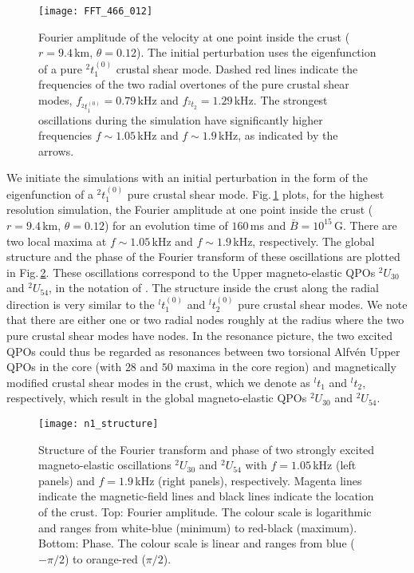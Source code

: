 \documentclass[useAMS,usenatbib]{mnras}
\begin{document}
%
\begin{figure}
\texttt{[image: FFT\_466\_012]}
\caption{Fourier amplitude of the velocity at one point inside the crust 
($r=9.4\,$km, $\theta=0.12$). The initial perturbation uses the eigenfunction 
of a pure $^2t^{(0)}_1$ crustal 
shear mode. Dashed red lines indicate the frequencies of the two radial 
overtones of the pure crustal shear modes, $f_{^2t^{(0)}_1}=0.79\,$kHz and 
$f_{^2t_2}=1.29\,$kHz. The strongest oscillations during the simulation have 
significantly higher frequencies $f\sim1.05\,$kHz and $f\sim1.9\,$kHz, as 
indicated by the arrows. }
\label{fig_n1_FFT}
\end{figure}

   We initiate the simulations with an initial perturbation in the form of the eigenfunction of a
$^2t^{(0)}_1$ pure crustal shear mode. Fig.\,\ref{fig_n1_FFT} plots, for the 
highest resolution simulation, the Fourier amplitude at one point inside the 
crust ($r=9.4\,$km, $\theta=0.12$) for an evolution time of $160\,$ms and $\bar 
B=10^{15}\,$G. There are two local maxima at $f\sim1.05\,$kHz and 
$f\sim1.9\,$kHz, respectively. The global structure and the phase of the Fourier 
transform of these oscillations are plotted in Fig.\,\ref{fig_n1_structure}. 
These oscillations correspond to the Upper magneto-elastic QPOs 
$^2U_{30}$ and $^2U_{54}$, in the notation of \citep{Gabler2016}. The structure 
inside the crust along the radial direction is very similar to the $^lt^{(0)}_1$ 
and $^lt^{(0)}_2$ pure crustal shear modes. We note that there are 
either one or two radial nodes roughly at the radius where the two pure
crustal shear modes have nodes. In the resonance picture, the two 
excited QPOs could thus be regarded as resonances between two torsional Alfv\'en 
Upper QPOs in the core (with $28$ and $50$ maxima in the core region) and  
magnetically modified crustal shear modes in the crust, which we denote as 
$^lt_1$ and $^lt_2$, respectively, which result in the global magneto-elastic 
QPOs $^2U_{30}$ and 
$^2U_{54}$. 
%
\begin{figure}
\texttt{[image: n1\_structure]}
\caption{Structure of the Fourier transform and phase of two strongly excited magneto-elastic oscillations $^2U_{30}$ and $^2U_{54}$ with $f=1.05\,$kHz (left panels) and $f=1.9\,$kHz (right panels), respectively. Magenta lines indicate the magnetic-field lines and black lines indicate the location of the crust. Top: Fourier amplitude. The colour scale is logarithmic and ranges 
from white-blue (minimum) to red-black (maximum). Bottom: Phase. The colour scale is linear and ranges from blue ($-\pi/2$) to orange-red ($\pi/2$).}
\label{fig_n1_structure}
\end{figure}
%
\end{document}
